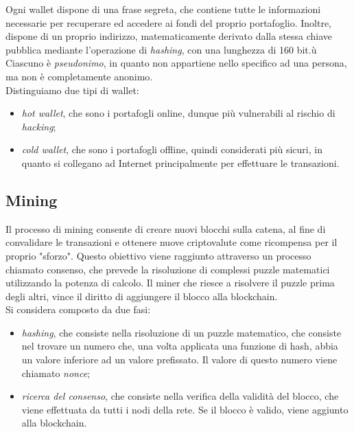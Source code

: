Ogni wallet dispone di una frase segreta, che contiene tutte le informazioni necessarie per recuperare ed accedere ai fondi del proprio portafoglio.
Inoltre, dispone di un proprio indirizzo, matematicamente derivato dalla stessa chiave pubblica mediante l'operazione di \textit{hashing}, con una lunghezza di 160 bit.ù
Ciascuno è \textit{pseudonimo}, in quanto non appartiene nello specifico ad una persona, ma non è completamente anonimo. \\

Distinguiamo due tipi di wallet:
\begin{itemize}
    \item \textit{hot wallet}, che sono i portafogli online, dunque più vulnerabili al rischio di \textit{hacking};
    \item \textit{cold wallet}, che sono i portafogli offline, quindi considerati più sicuri, in quanto si collegano ad Internet principalmente per effettuare le transazioni.
\end{itemize}

\subsection{Mining}\label{sec:tecnologie-blockchain-mining}

Il processo di mining consente di creare nuovi blocchi sulla catena, al fine di convalidare le transazioni e ottenere nuove criptovalute come ricompensa per il proprio "sforzo".
Questo obiettivo viene raggiunto attraverso un processo chiamato consenso, che prevede la risoluzione di complessi puzzle matematici utilizzando la potenza di calcolo.
Il miner che riesce a risolvere il puzzle prima degli altri, vince il diritto di aggiungere il blocco alla blockchain. \\

Si considera composto da due fasi:
\begin{itemize}
    \item \textit{hashing}, che consiste nella risoluzione di un puzzle matematico, che consiste nel trovare un numero che, una volta applicata una funzione di hash, abbia un valore inferiore ad un valore prefissato. Il valore di questo numero viene chiamato \textit{nonce};
    \item \textit{ricerca del consenso}, che consiste nella verifica della validità del blocco, che viene effettuata da tutti i nodi della rete. Se il blocco è valido, viene aggiunto alla blockchain.
\end{itemize}

